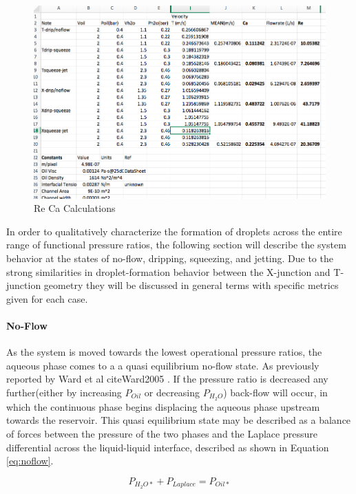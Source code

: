 \begin{figure}[h]
\centering 
\includegraphics[width=01.0\columnwidth]{ReCa_calc.PNG} 
\caption[Re Ca Calculations]{Re Ca Calculations }
\label{fig:ReCa_calc} 
\end{figure}


\clearpage

In order to qualitatively characterize the formation of droplets across the entire range of functional pressure ratios, the following section will describe the system behavior at the states of no-flow, dripping, squeezing, and jetting. Due to the strong similarities in droplet-formation behavior between the X-junction and T-junction geometry they will be discussed in general terms with specific metrics given for each case.



\paragraph{No-Flow}
As the system is moved towards the lowest operational pressure ratios, the aqueous phase comes to a a quasi equilibrium no-flow state. As previously reported by Ward et al cite{Ward2005} . If the pressure ratio is decreased any further(either by increasing $P_{Oil}$ or decreasing $P_{H_2O}$) back-flow will occur, in which the continuous phase begins displacing the aqueous phase upstream towards the reservoir. This quasi equilibrium state may be described as a balance of forces between the pressure of the two phases and the Laplace pressure differential across the liquid-liquid interface, described as shown in Equation \vref{eq:noflow}.

\begin{equation}
P_{H_2O*} + P_{Laplace} = P_{Oil*} 
\label{eq:noflow}
\end{equation}


